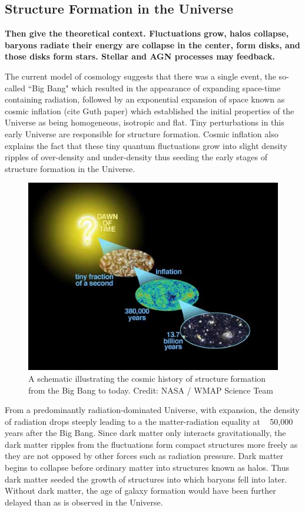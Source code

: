 \subsection{Structure Formation in the Universe}
{\bf Then give the theoretical context.
Fluctuations grow, halos collapse, baryons radiate their
energy are collapse in the center, form disks, and those
disks form stars. Stellar and AGN processes may feedback.}

The current model of cosmology suggests that there was a single event, the so-called ``Big Bang" which resulted in the appearance of expanding space-time containing radiation, followed by an exponential expansion of space known as cosmic inflation (cite Guth paper) which established the initial properties of the Universe as being homogeneous, isotropic and flat. Tiny perturbations in this early Universe are responsible for structure formation. Cosmic inflation also explains the fact that these tiny quantum fluctuations grow into slight density ripples of over-density and under-density thus seeding the early stages of structure formation in the Universe.\\

\begin{figure}
\includegraphics[width=\textwidth]{figures/wmap_cosmic_history}
\caption[Short figure name.]{ A schematic illustrating the cosmic history of structure formation from the Big Bang to today. Credit: NASA / WMAP Science Team
\label{fig:cosmic_history}}
\end{figure}

From a predominantly radiation-dominated Universe, with expansion, the density of radiation drops steeply leading to a the matter-radiation equality at ~ 50,000 years after the Big Bang. Since dark matter only interacts gravitationally, the dark matter ripples from the fluctuations form compact structures more freely as they are not opposed by other forces such as radiation pressure. Dark matter begins to collapse before ordinary matter into structures known as halos. Thus dark matter seeded the growth of structures into which baryons fell into later. Without dark matter, the age of galaxy formation would have been further delayed than as is observed in the Universe.\\

